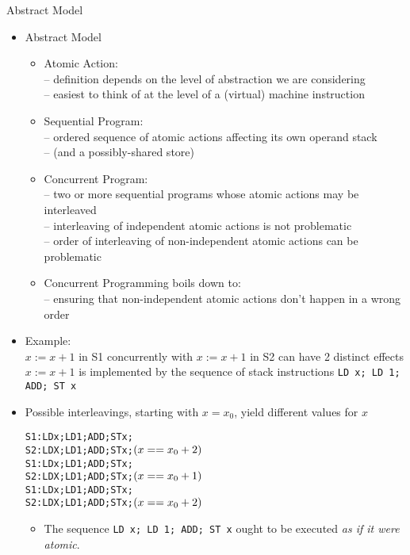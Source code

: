 \documentclass{concdistfoils}
\begin{document}
\begin{section}{Abstract Model}
\begin{slide}
\begin{itemize}
\item Abstract Model
\vfill
\begin{itemize}
\item Atomic Action:
        \\-- definition depends on the level of abstraction we are considering
        \\-- easiest to think of at the level of a (virtual) machine instruction
\vfill
\item Sequential Program: 
        \\-- ordered sequence of atomic actions affecting its own operand stack 
        \\-- (and a possibly-shared store)
\vfill
\item Concurrent Program: 
        \\-- two or more sequential programs whose atomic actions may be interleaved 
        \\-- interleaving of independent atomic actions is not problematic
        \\-- order of interleaving of non-independent atomic actions can be problematic
\vfill
\item Concurrent Programming boils down to:
        \\-- ensuring that non-independent atomic actions don't happen in a wrong order
\end{itemize}
\end{itemize}
\end{slide}

\begin{slide}

\begin{itemize}
\item Example: \\
        $x:=x+1$ in S1 concurrently with $x:=x+1$ in S2 can have 2 distinct effects
\\[1.5ex]
        $x:=x+1$ is implemented by the sequence of stack instructions 
        \verb/LD x; LD 1; ADD; ST x/ 
        
\vfill
\item Possible interleavings, starting with $x=x_0$, yield different values for $x$
\begin{alltt}
S1:     LD x; LD 1; ADD;  ST x; 
S2:                             LD X; LD 1; ADD; ST x;   \((x==x\sb0+2)\)  
\hrulefill
S1:     LD x;       LD 1;             ADD; ST x; 
S2:           LD X;       LD 1; ADD;             ST x;   \((x==x\sb0+1)\) 
\hrulefill
S1:                             LD x; LD 1; ADD;  ST x; 
S2:     LD X; LD 1; ADD; ST x;                           \((x==x\sb0+2)\)  
\end{alltt}
\vfill
\begin{smaller}
\begin{itemize}
\item The sequence \verb/LD x; LD 1; ADD; ST x/ ought to be executed
      \textit{as if it were atomic}. 


\end{itemize}
\end{smaller}
\end{itemize}
\end{slide}
\end{section}
\end{document}
